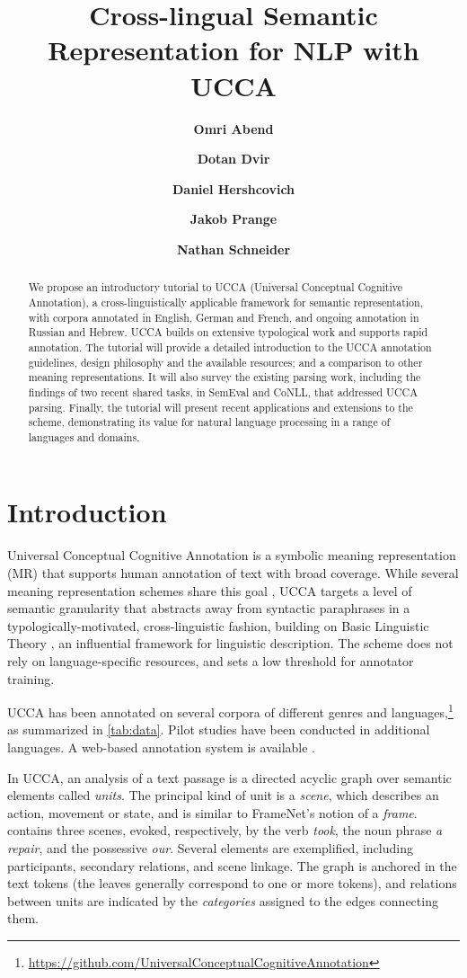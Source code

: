 \documentclass[11pt,a4paper,table]{article}
\title{Cross-lingual Semantic Representation for NLP with UCCA}
\author[*]{\textbf{Omri Abend}}
\author[*]{\textbf{Dotan Dvir}}
\author[**]{\textbf{Daniel Hershcovich}}
\author[***]{\textbf{Jakob Prange}}
\author[***]{\textbf{Nathan Schneider}}
\affil[*]{Hebrew University of Jerusalem}
\affil[**]{University of Copenhagen}
\affil[***]{Georgetown University}
\affil[ ]{
\texttt{oabend@cs.huji.ac.il},\quad
\texttt{dotan.dvir@mail.huji.ac.il},\quad
\texttt{dh@di.ku.dk}}
\affil[ ]{
\texttt{jakob@cs.georgetown.edu},\quad
\texttt{nathan.schneider@georgetown.edu}
}
\begin{document}
\maketitle

\begin{abstract}
We propose an introductory tutorial to UCCA (Universal Conceptual Cognitive Annotation), a cross-linguistically applicable framework for semantic representation, with corpora annotated in English, German and French, and ongoing annotation in Russian and Hebrew. UCCA builds on extensive typological work and supports rapid annotation. The tutorial will provide a detailed introduction to the UCCA annotation guidelines, design philosophy and the available resources; and a comparison to other meaning representations. It will also survey the existing parsing work, including the findings of two recent shared tasks, in SemEval and CoNLL, that addressed UCCA parsing. Finally, the tutorial will present recent applications and extensions to the scheme, demonstrating its value for natural language processing in a range of languages and domains.
\end{abstract}


\section{Introduction}\label{sec:introduction}

Universal Conceptual Cognitive Annotation \cite[UCCA;][]{abend2013universal} 
is a symbolic meaning representation (MR)
that supports human annotation of text with broad coverage.
While several meaning representation schemes share this goal
\citep{abend2017state}, UCCA targets a level of semantic granularity that abstracts away from syntactic paraphrases in a typologically-motivated, cross-linguistic fashion, building on Basic Linguistic Theory \citep{Dixon:basic}, an influential framework for linguistic description.
The scheme does not rely on language-specific resources, and sets a low
threshold for annotator training.

UCCA has been annotated on several corpora of different genres and
languages,\footnote{\scriptsize\url{https://github.com/UniversalConceptualCognitiveAnnotation}} as summarized in \cref{tab:data}.
Pilot studies have been conducted in additional languages.
A web-based annotation system is available \cite{abend2017uccaapp}.

In UCCA, an analysis of a text passage is a directed acyclic graph
over semantic elements called \textit{units}.
The principal kind of unit is a \textit{scene},
which describes an action, movement or state, and is similar to FrameNet's notion of a {\it frame}.
 contains three scenes, evoked, respectively,
by the verb \textit{took},
the noun phrase \textit{a repair}, and the possessive \textit{our}.
Several elements are exemplified, including participants,
secondary relations, and scene linkage.
The graph is anchored in the text tokens (the leaves generally correspond to one or more tokens), and relations between units
are indicated by the \textit{categories} assigned to the edges connecting them.
\end{document}
